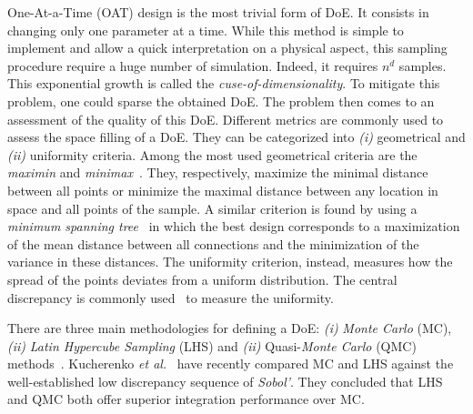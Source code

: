 One-At-a-Time (OAT) design is the most trivial form of DoE. It consists in changing only one parameter at a time. While this method is simple to implement and allow a quick interpretation on a physical aspect, this sampling procedure require a huge number of simulation. Indeed, it requires $n^d$ samples. This exponential growth is called the \emph{cuse-of-dimensionality}. To mitigate this problem, one could sparse the obtained DoE. The problem then comes to an assessment of the quality of this DoE. Different metrics are commonly used to assess the space filling of a DoE. They can be categorized into \emph{(i)} geometrical and \emph{(ii)} uniformity criteria. Among the most used geometrical criteria are the \emph{maximin} and \emph{minimax}~\citep{Pronzato2017}. They, respectively, maximize the minimal distance between all points or minimize the maximal distance between any location in space and all points of the sample. A similar criterion is found by using a \emph{minimum spanning tree}~\citep{Franco2009} in which the best design corresponds to a maximization of the mean distance between all connections and the minimization of the variance in these distances. The uniformity criterion, instead, measures how the spread of the points deviates from a uniform distribution. The central discrepancy is commonly used~\citep{Fang2006,Damblin2013} to measure the uniformity.

There are three main methodologies for defining a DoE: \emph{(i)} \emph{Monte Carlo} (MC), \emph{(ii)} \emph{Latin Hypercube Sampling} (LHS) and \emph{(ii)} Quasi-\emph{Monte Carlo} (QMC) methods~\citep{Cavazzuti2013,Garud2017}. Kucherenko \emph{et al.}~\citep{Kucherenko2015} have recently compared MC and LHS against the well-established low discrepancy sequence of \emph{Sobol'}. They concluded that LHS and QMC both offer superior integration performance over MC.

